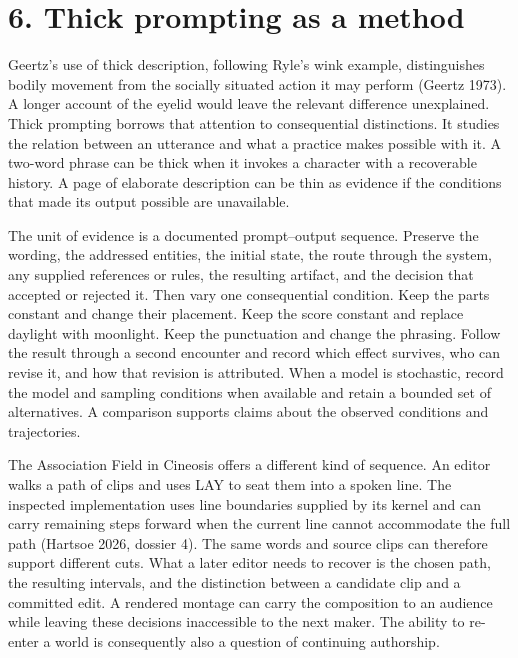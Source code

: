 \documentclass[
  11pt,
  letterpaper,
]{article}
\begin{document}
\hypertarget{thick-prompting-as-a-method}{%
\section{6. Thick prompting as a
method}\label{thick-prompting-as-a-method}}

Geertz's use of thick description, following Ryle's wink example,
distinguishes bodily movement from the socially situated action it may
perform (Geertz 1973). A longer account of the eyelid would leave the
relevant difference unexplained. Thick prompting borrows that attention
to consequential distinctions. It studies the relation between an
utterance and what a practice makes possible with it. A two-word phrase
can be thick when it invokes a character with a recoverable history. A
page of elaborate description can be thin as evidence if the conditions
that made its output possible are unavailable.

The unit of evidence is a documented prompt--output sequence. Preserve
the wording, the addressed entities, the initial state, the route
through the system, any supplied references or rules, the resulting
artifact, and the decision that accepted or rejected it. Then vary one
consequential condition. Keep the parts constant and change their
placement. Keep the score constant and replace daylight with moonlight.
Keep the punctuation and change the phrasing. Follow the result through
a second encounter and record which effect survives, who can revise it,
and how that revision is attributed. When a model is stochastic, record
the model and sampling conditions when available and retain a bounded
set of alternatives. A comparison supports claims about the observed
conditions and trajectories.

The Association Field in Cineosis offers a different kind of sequence.
An editor walks a path of clips and uses LAY to seat them into a spoken
line. The inspected implementation uses line boundaries supplied by its
kernel and can carry remaining steps forward when the current line
cannot accommodate the full path (Hartsoe 2026, dossier 4). The same
words and source clips can therefore support different cuts. What a
later editor needs to recover is the chosen path, the resulting
intervals, and the distinction between a candidate clip and a committed
edit. A rendered montage can carry the composition to an audience while
leaving these decisions inaccessible to the next maker. The ability to
re-enter a world is consequently also a question of continuing
authorship.
\end{document}
